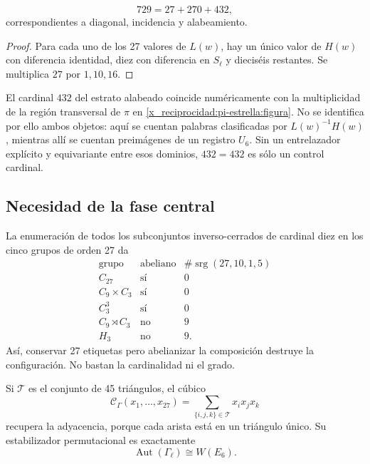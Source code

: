 \begin{theorem}
\label{x_reciprocidad:p12-83-c20-s6:thm:particion-hensel-schlafli-nueva}
\begin{equation}
 729=27+270+432,
 \label{x_reciprocidad:p12-83-c20-s6:eq:particion-729-e6-nueva}
\end{equation}
correspondientes a diagonal, incidencia y alabeamiento.
\end{theorem}

\begin{proof}
Para cada uno de los 27 valores de \(L(w)\), hay un único valor de
\(H(w)\) con diferencia identidad, diez con diferencia en \(S_\ell\) y
dieciséis restantes. Se multiplica \(27\) por \(1,10,16\).
\end{proof}

El cardinal \(432\) del estrato alabeado coincide numéricamente con la
multiplicidad de la región transversal de \(\pi\) en
\cref{x_reciprocidad:pi-estrella:figura}. No se identifica por ello ambos objetos: aquí
se cuentan palabras clasificadas por \(L(w)^{-1}H(w)\), mientras allí se
cuentan preimágenes de un registro \(U_6\). Sin un entrelazador explícito y
equivariante entre esos dominios, \(432=432\) es sólo un control cardinal.

\subsection{Necesidad de la fase central}

La enumeración de todos los subconjuntos inverso-cerrados de cardinal diez
en los cinco grupos de orden 27 da
\[
\begin{array}{c|c|c}
\text{grupo}&\text{abeliano}&
\#\operatorname{srg}(27,10,1,5)\\ \hline
C_{27}&\text{sí}&0\\
C_9\times C_3&\text{sí}&0\\
C_3^3&\text{sí}&0\\
C_9\rtimes C_3&\text{no}&9\\
H_3&\text{no}&9.
\end{array}
\]
Así, conservar 27 etiquetas pero abelianizar la composición destruye la
configuración. No bastan la cardinalidad ni el grado.

Si \(\mathcal T\) es el conjunto de 45 triángulos, el cúbico
\[
 \mathcal C_\Gamma(x_1,\ldots,x_{27})
 =\sum_{\{i,j,k\}\in\mathcal T}x_ix_jx_k
\]
recupera la adyacencia, porque cada arista está en un triángulo único. Su
estabilizador permutacional es exactamente
\[
 \operatorname{Aut}(\Gamma_\ell)\cong W(E_6).
\]

